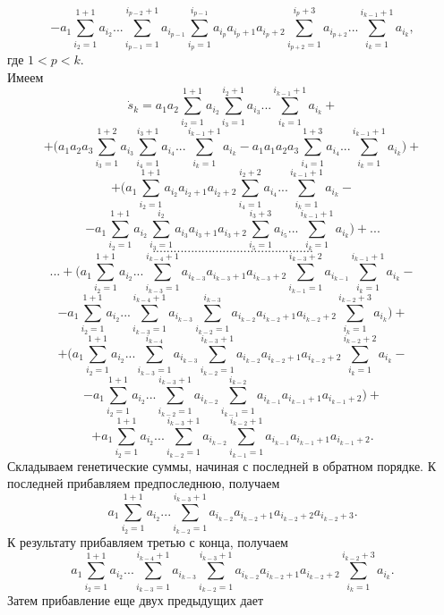 \documentclass[12pt,a4paper]{article}
\theoremstyle{plain}   \newtheorem{Pro}{Задача}
\begin{document}
$$
  -a_1 \sum _{i_2 =1}^{1+1}a_{i_2}...
    \sum _{i_{p-1}=1}^{i_{p-2}+1}a_{i_{p-1}}
	  \sum _{i_p =1}^{i_{p-1}}a_{i_p}a_{i_p +1}a_{i_p +2}
	    \sum _{i_{p+2}=1}^{i_p +3}a_{i_{p+2}}...
		  \sum _{i_k =1}^{i_{k-1}+1}a_{i_k},
$$
где
$ 1<p<k. $ \\
Имеем
$$
  \dot s_k =a_1 a_2
    \sum _{i_2 =1}^{1+1}a_{i_2}
	  \sum _{i_3 =1}^{i_2 +1}a_{i_3}...
	    \sum _{i_k =1}^{i_{k-1}+1}a_{i_k}+
$$
$$
  + \Biggl (
    a_1 a_2 a_3 \sum _{i_3 =1}^{1+2}a_{i_3}
	  \sum _{i_4 =1}^{i_3 +1}a_{i_4}...
	    \sum _{i_k =1}^{i_{k-1}+1}a_{i_k}-
  a_1 a_1 a_2 a_3
    \sum _{i_4 =1}^{1+3}a_{i_4}...
	  \sum _{i_k =1}^{i_{k-1}+1}a_{i_k}
	    \Biggr ) +
$$
$$
  +\Biggl ( a_1
    \sum _{i_2 =1}^{1+1}a_{i_2}a_{i_2 +1}a_{i_2 +2}
	  \sum _{i_4 =1}^{i_2 +2}a_{i_4}...
	    \sum _{i_k =1}^{i_{k-1}+1}a_{i_k}-
$$
$$
  -a_1
    \sum _{i_2 =1}^{1+1}a_{i_2}
	  \sum _{i_3 =1}^{i_2}a_{i_3}a_{i_3 +1}a_{i_3 +2}
	    \sum _{i_5 =1}^{i_3 +3}a_{i_5}...
		  \sum _{i_k =1}^{i_{k-1}+1}a_{i_k}
		    \Biggr ) +...
$$
$$ \; $$
$$
  ..............................................
$$
$$ \; $$
$$
  ...+ \Biggl ( a_1
    \sum _{i_2 =1}^{1+1}a_{i_2}...
	  \sum _{i_{k-3}=1}^{i_{k-4}+1}a_{i_{k-3}}a_{i_{k-3}+1}a_{i_{k-3}+2}
	    \sum _{i_{k-1}=1}^{i_{k-3}+2}a_{i_{k-1}}
		  \sum _{i_k =1}^{i_{k-1}+1}a_{i_k}-
$$
$$
  -a_1
    \sum _{i_2 =1}^{1+1}a_{i_2}...
	  \sum _{i_{k-3}=1}^{i_{k-4}+1}a_{i_{k-3}}
	    \sum _{i_{k-2}=1}^{i_{k-3}}a_{i_{k-2}}a_{i_{k-2}+1}a_{i_{k-2}+2}
		  \sum _{i_k =1}^{i_{k-2}+3} a_{i_k}
		    \Biggr ) +
$$
$$
  + \Biggl ( a_1
    \sum _{i_2 =1}^{1+1}a_{i_2}...
	  \sum _{i_{k-3}=1}^{i_{k-4}}a_{i_{k-3}}
	    \sum _{i_{k-2}=1}^{i_{k-3}+1}a_{i_{k-2}}a_{i_{k-2}+1}a_{i_{k-2}+2}
		  \sum _{i_k =1}^{i_{k-2}+2}a_{i_k}-
$$
$$
  -a_1 \sum _{i_2 =1}^{1+1}a_{i_2}...
    \sum _{i_{k-2}=1}^{i_{k-3}+1}a_{i_{k-2}}
	  \sum _{i_{k-1}=1}^{i_{k-2}}
	    a_{i_{k-1}}a_{i_{k-1}+1}a_{i_{k-1}+2} \Biggr ) +
$$
$$
  +a_1 \sum _{i_2 =1}^{1+1}a_{i_2}...
    \sum _{i_{k-2}=1}^{i_{k-3}+1}a_{i_{k-2}}
	  \sum _{i_{k-1}=1}^{i_{k-2}+1}
	    a_{i_{k-1}}a_{i_{k-1}+1}a_{i_{k-1}+2} .
$$
Складываем генетические суммы, начиная с последней
в обратном порядке. К последней прибавляем предпоследнюю,
получаем
$$
  a_1 \sum _{i_2 =1}^{1+1}a_{i_2}...
    \sum _{i_{k-2}=1}^{i_{k-3}+1}
	  a_{i_{k-2}}a_{i_{k-2}+1}a_{i_{k-2}+2}a_{i_{k-2}+3}.
$$
К результату прибавляем третью с конца, получаем
$$
  a_1 \sum _{i_2 =1}^{1+1}a_{i_2}...
    \sum _{i_{k-3}=1}^{i_{k-4}+1}a_{i_{k-3}}
	  \sum _{i_{k-2}=1}^{i_{k-3}+1}
	    a_{i_{k-2}}a_{i_{k-2}+1}a_{i_{k-2}+2}
		  \sum _{i_k =1}^{i_{k-2}+3} a_{i_k}.
$$
Затем прибавление еще двух предыдущих дает
\end{document}
